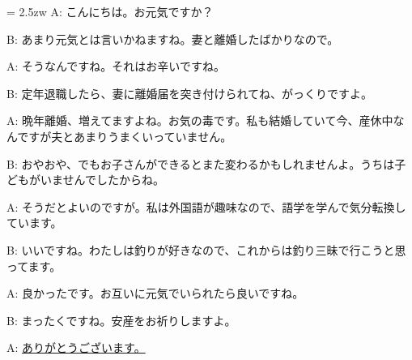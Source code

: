 \documentclass[11pt]{amsart}
\title{}
\author{}
\newenvironment{hangall}[1]{\hangindent = 2.5zw\everypar{\hangindent = 2.5zw}}{}
\begin{document}
\maketitle
\begin{hangall}{}%
A: こんにちは。お元気ですか？

B: あまり元気とは言いかねますね。妻と離婚したばかりなので。

A: そうなんですね。それはお辛いですね。

B: 定年退職したら、妻に離婚届を突き付けられてね、がっくりですよ。

A: 晩年離婚、増えてますよね。お気の毒です。私も結婚していて今、産休中なんですが夫とあまりうまくいっていません。

B: おやおや、でもお子さんができるとまた変わるかもしれませんよ。うちは子どもがいませんでしたからね。

A: そうだとよいのですが。私は外国語が趣味なので、語学を学んで気分転換しています。

B: いいですね。わたしは釣りが好きなので、これからは釣り三昧で行こうと思ってます。

A: 良かったです。お互いに元気でいられたら良いですね。

B: まったくですね。安産をお祈りしますよ。

A: \ul{ありがとうございます。}\end{hangall}
\end{document}
